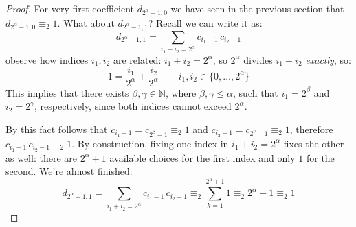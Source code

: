 \begin{proof}
    For very first coefficient $d_{2^{\alpha}-1,0}$ we have seen in the
    previous section that $d_{2^{\alpha}-1,0}\equiv_{2}1$. What about $d_{2^{\alpha}-1,1}$?
    Recall we can write it as:
    \begin{displaymath}
        d_{2^{\alpha}-1,1} = \sum_{i_{1}+ i_{2}=2^{\alpha}}{ c_{i_{1}-1}\,c_{i_{2}-1} }
    \end{displaymath}
    observe how indices $i_{1}, i_{2}$ are related: $i_{1}+ i_{2}=2^{\alpha}$,
    so $2^{\alpha}$ divides $i_{1}+i_{2}$ \emph{exactly}, so:
    \begin{displaymath}
        1 = \frac{i_{1}}{2^{\alpha}}+\frac{i_{2}}{2^{\alpha}} \qquad 
            i_{1},i_{2}\in\lbrace 0,\ldots,2^{\alpha}\rbrace
    \end{displaymath}
    This implies that there exists $\beta,\gamma\in\mathbb{N}$, where $\beta,\gamma\leq\alpha$,
    such that $i_{1}=2^{\beta}$ and $i_{2}=2^{\gamma}$, respectively, since both indices
    cannot exceed $2^{\alpha}$.

    By this fact follows that $c_{i_{1}-1}=c_{2^{\beta}-1}\equiv_{2}1$ and 
    $c_{i_{2}-1}=c_{2^{\gamma}-1}\equiv_{2}1$, therefore $c_{i_{1}-1}\,c_{i_{2}-1}\equiv_{2}1$.
    By construction, fixing one index in  
    $i_{1}+ i_{2}=2^{\alpha}$ fixes the other as well: there are $2^{\alpha}+1$ available choices
    for the first index and only $1$ for the second.
    We're almost finished:
    \begin{displaymath}
        d_{2^{\alpha}-1,1} = \sum_{i_{1}+ i_{2}=2^{\alpha}}{ c_{i_{1}-1}\,c_{i_{2}-1} }
            \equiv_{2} \sum_{k=1}^{2^{\alpha}+1}{1}\equiv_{2} 2^{\alpha}+1\equiv_{2} 1
    \end{displaymath}


\end{proof}
